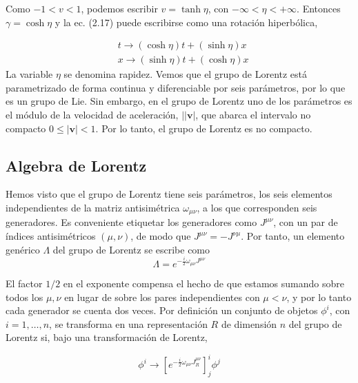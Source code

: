       Como $-1<v<1$, podemos escribir $v=\tanh \eta$, con $-\infty<\eta<+\infty$. Entonces $\gamma=\cosh \eta$ y la ec. (2.17) puede escribirse como una rotación hiperbólica,

      \begin{align*}
        & t \rightarrow(\cosh \eta) t+(\sinh \eta) x \\
        & x \rightarrow(\sinh \eta) t+(\cosh \eta) x \tag{2.18}
      \end{align*}
      La variable $\eta$ se denomina rapidez. Vemos que el grupo de Lorentz está parametrizado de forma continua y diferenciable por seis parámetros, por lo que es un grupo de Lie. Sin embargo, en el grupo de Lorentz uno de los parámetros es el módulo de la velocidad de aceleración, $||\mathbf{v}|$, que abarca el intervalo no compacto $0 \leqslant|\mathbf{v}|<1$. Por lo tanto, el grupo de Lorentz es no compacto.
      
      \subsection{Algebra de Lorentz}

      Hemos visto que el grupo de Lorentz tiene seis parámetros, los seis elementos independientes de la matriz antisimétrica $\omega_{\mu \nu}$, a los que corresponden seis generadores. Es conveniente etiquetar los generadores como $J^{\mu \nu}$, con un par de índices antisimétricos $(\mu, \nu)$, de modo que $J^{\mu \nu}=-J^{\nu \mu}$. Por tanto, un elemento genérico $\Lambda$ del grupo de Lorentz se escribe como
      \begin{equation*}
        \Lambda=e^{-\frac{i}{2} \omega_{\mu \nu} J^{\mu \nu}} \tag{2.19}
        \end{equation*}

        El factor $1 / 2$ en el exponente compensa el hecho de que estamos sumando sobre todos los $\mu, \nu$ en lugar de sobre los pares independientes con $\mu<\nu$, y por lo tanto cada generador se cuenta dos veces. Por definición un conjunto de objetos $\phi^{i}$, con $i=1, \ldots, n$, se transforma en una representación $R$ de dimensión $n$ del grupo de Lorentz si, bajo una transformación de Lorentz,

        \begin{equation*}
          \phi^{i} \rightarrow\left[e^{-\frac{i}{2} \omega_{\mu \nu} J_{R}^{\mu \nu}}\right]_{j}^{i} \phi^{j} \tag{2.20}
          \end{equation*}

